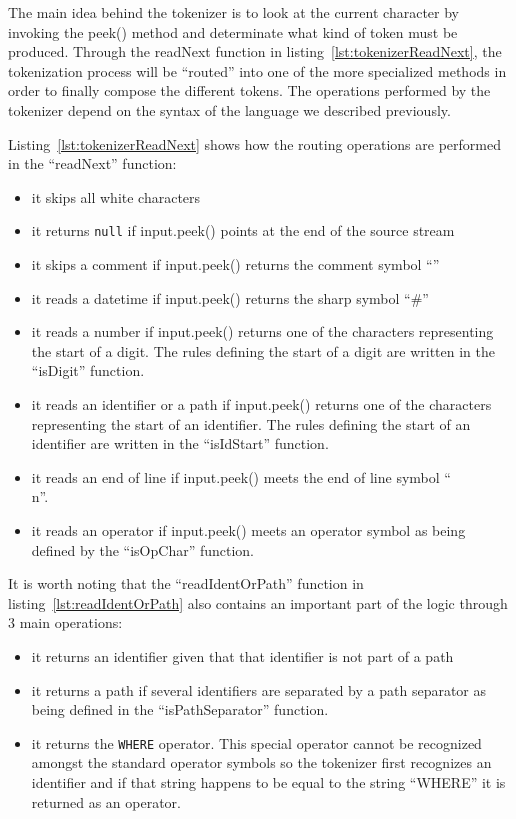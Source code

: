 The main idea behind the tokenizer is to look at the current character by invoking the peek() method and determinate what kind of token must be produced. Through the readNext function in listing~\ref{lst:tokenizerReadNext}, the tokenization process will be ``routed'' into one of the more specialized methods in order to finally compose the different tokens. The operations performed by the tokenizer depend on the syntax of the language we described previously.



Listing~\ref{lst:tokenizerReadNext} shows how the routing operations are performed in the ``readNext'' function:
\begin{itemize}
    \item it skips all white characters
    \item it returns \texttt{null} if input.peek() points at the end of the source stream
    \item it skips a comment if input.peek() returns the comment symbol ``\textquotesingle''
    \item it reads a datetime if input.peek() returns the sharp symbol ``\#''
    \item it reads a number if input.peek() returns one of the characters representing the start of a digit. The rules defining the start of a digit are written in the ``isDigit'' function.
    \item it reads an identifier or a path if input.peek() returns one of the characters representing the start of an identifier. The rules defining the start of an identifier are written in the ``isIdStart'' function.
    \item it reads an end of line if input.peek() meets the end of line symbol ``\\n''. 
    \item it reads an operator if input.peek() meets an operator symbol as being defined by the ``isOpChar'' function.
\end{itemize}

It is worth noting that the ``readIdentOrPath'' function in listing~\ref{lst:readIdentOrPath} also contains an important part of the logic through 3 main operations:
\begin{itemize}
    \item it returns an identifier given that that identifier is not part of a path
    \item it returns a path if several identifiers are separated by a path separator as being defined in the ``isPathSeparator'' function.
    \item it returns the \texttt{WHERE} operator. This special operator cannot be recognized amongst the standard operator symbols so the tokenizer first recognizes an identifier and if that string happens to be equal to the string ``WHERE'' it is returned as an operator.
\end{itemize}

